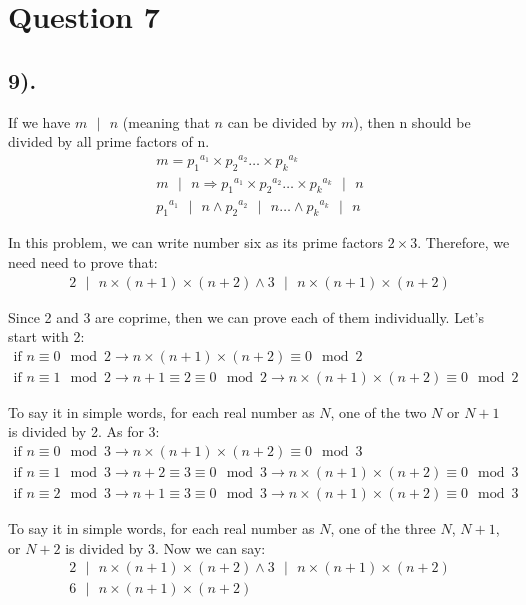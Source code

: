 \documentclass[12pt]{article}
\begin{document}
\section*{Question 7}
\subsection*{9).}
If we have $m\text{ $|$ }n$ (meaning that $n$ can be divided by $m$), then n should be divided by all prime factors of n.
\begin{gather*}
    m = {p_{1}}^{a_{1}} \times {p_{2}}^{a_{2}} \ldots \times {p_{k}}^{a_{k}} \\
    m \text{ $|$ } n \Rightarrow {p_{1}}^{a_{1}} \times {p_{2}}^{a_{2}} \ldots \times {p_{k}}^{a_{k}} \text{ $|$ } n \\
    {p_{1}}^{a_{1}} \text{ $|$ } n \wedge {p_{2}}^{a_{2}} \text{ $|$ } n \ldots \wedge {p_{k}}^{a_{k}} \text{ $|$ } n
\end{gather*}

In this problem, we can write number six as its prime factors $2 \times 3$. Therefore, we need need to prove that:
\begin{gather*}
    2 \text{ $|$ } n \times (n+1) \times (n+2) \wedge 3 \text{ $|$ } n \times (n+1) \times (n+2)
\end{gather*}

Since 2 and 3 are coprime, then we can prove each of them individually. Let's start with 2:
\begin{gather*}
    \text{if } n \equiv 0 \mod 2 \to n \times (n+1) \times (n+2) \equiv 0 \mod 2 \\
    \text{if } n \equiv 1 \mod 2 \to n+1 \equiv 2 \equiv 0 \mod 2 \to n \times (n+1) \times (n+2) \equiv 0 \mod 2
\end{gather*}

To say it in simple words, for each real number as $N$, one of the two $N$ or $N+1$ is divided by 2. As for 3:
\begin{gather*}
    \text{if } n \equiv 0 \mod 3 \to n \times (n+1) \times (n+2) \equiv 0 \mod 3 \\
    \text{if } n \equiv 1 \mod 3 \to n+2 \equiv 3 \equiv 0 \mod 3 \to n \times (n+1) \times (n+2) \equiv 0 \mod 3 \\
    \text{if } n \equiv 2 \mod 3 \to n+1 \equiv 3 \equiv 0 \mod 3 \to n \times (n+1) \times (n+2) \equiv 0 \mod 3
\end{gather*}

To say it in simple words, for each real number as $N$, one of the three $N$, $N+1$, or $N+2$ is divided by 3. Now we can say:
\begin{gather*}
    2 \text{ $|$ } n \times (n+1) \times (n+2) \wedge 3 \text{ $|$ } n \times (n+1) \times (n+2) \\
    6 \text{ $|$ } n \times (n+1) \times (n+2)
\end{gather*}
\end{document}
